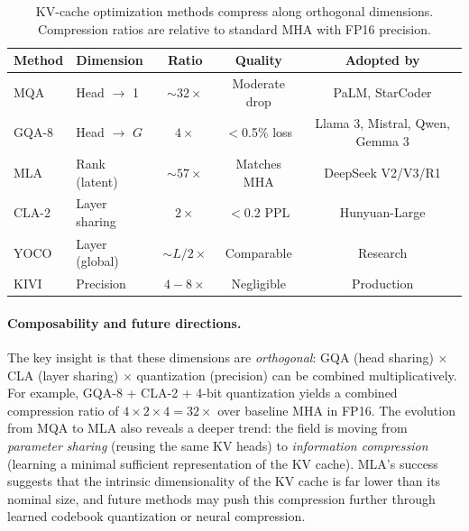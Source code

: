 \documentclass[11pt,a4paper]{article}
\begin{document}
\begin{table}[t]
\centering
\caption{KV-cache optimization methods compress along orthogonal dimensions. Compression ratios are relative to standard MHA with FP16 precision.}
\label{tab:kv-cache}
\small
\begin{tabular}{llccc}
\toprule
\textbf{Method} & \textbf{Dimension} & \textbf{Ratio} & \textbf{Quality} & \textbf{Adopted by} \\
\midrule
MQA~\cite{shazeer2019fast}  & Head $\to$ 1    & ${\sim}32\times$  & Moderate drop    & PaLM, StarCoder \\
GQA-8~\cite{ainslie2023gqa} & Head $\to$ $G$  & $4\times$         & $<$0.5\% loss    & Llama 3, Mistral, Qwen, Gemma 3 \\
MLA~\cite{deepseekv2_2024_mla}  & Rank (latent) & ${\sim}57\times$ & Matches MHA & DeepSeek V2/V3/R1 \\
CLA-2~\cite{brandon2024reducing} & Layer sharing   & $2\times$         & $<$0.2 PPL    & Hunyuan-Large \\
YOCO~\cite{sun2024yoco}     & Layer (global)  & ${\sim}L/2\times$ & Comparable    & Research \\
KIVI~\cite{liu2024kivi}     & Precision       & $4{-}8\times$     & Negligible    & Production \\
\bottomrule
\end{tabular}
\end{table}

\paragraph{Composability and future directions.}
The key insight is that these dimensions are \emph{orthogonal}: GQA (head sharing) $\times$ CLA (layer sharing) $\times$ quantization (precision) can be combined multiplicatively. For example, GQA-8 + CLA-2 + 4-bit quantization yields a combined compression ratio of $4 \times 2 \times 4 = 32\times$ over baseline MHA in FP16. The evolution from MQA to MLA also reveals a deeper trend: the field is moving from \emph{parameter sharing} (reusing the same KV heads) to \emph{information compression} (learning a minimal sufficient representation of the KV cache). MLA's success suggests that the intrinsic dimensionality of the KV cache is far lower than its nominal size, and future methods may push this compression further through learned codebook quantization or neural compression.



\end{document}
